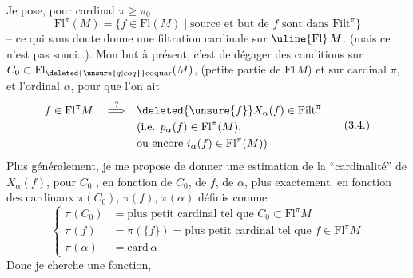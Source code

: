 Je pose, pour  cardinal $\pi\geq\pi_0$
\[
\mathrm{Fl}^{\pi}(M)=\{f\in\mathrm{Fl}(M)\mid\text{source et but de }f\text{ sont dans }\mathrm{Filt}^{\pi}\}\tag*{(3.3.)}
\]
-- ce qui sans doute donne une filtration cardinale sur $\uline{\mathrm{Fl}}\,M$. (mais ce n'est pas  souci\ldots). Mon but à présent, c'est de dégager des conditions sur $C_0\subset\mathrm{Fl}_{\deleted{\unsure{q|coq}}\mathrm{coquar}}(M)$, (petite partie de $\mathrm{Fl}\,M$) et sur  cardinal $\pi$, et l'ordinal $\alpha$, pour que l'on ait
\[
\begin{aligned}
f\in\mathrm{Fl}^{\pi}M\quad\overset{?}{\Longrightarrow}\quad&\deleted{\unsure{f}}X_\alpha(f)\in\mathrm{Filt}^{\pi}\\
&\text{(i.e. }p_\alpha(f)\in\mathrm{Fl}^{\pi}(M),\\
&\text{ou encore }i_\alpha(f)\in\mathrm{Fl}^{\pi}(M)\text{)}
\end{aligned}\tag*{(3.4.)}
\]
Plus généralement, je me propose de donner une  estimation de la ``cardinalité'' de $X_\alpha(f)$, pour $C_0$ , en fonction de $C_0$, de $f$, de $\alpha$, plus exactement, en fonction des  cardinaux $\pi(C_0)$, $\pi(f)$, $\pi(\alpha)$ définis comme
\[
\left\{\begin{aligned}
\pi(C_0)&=\text{plus petit cardinal tel que }C_0\subset\mathrm{Fl}^{\pi}M\\
\pi(f)&=\pi(\{f\})=\text{plus petit cardinal tel que }f\in\mathrm{Fl}^{\pi}M\\
\pi(\alpha)&=\mathrm{card}\,\alpha
\end{aligned}\right.\tag*{3.5.}
\]
Donc je cherche une fonction,

